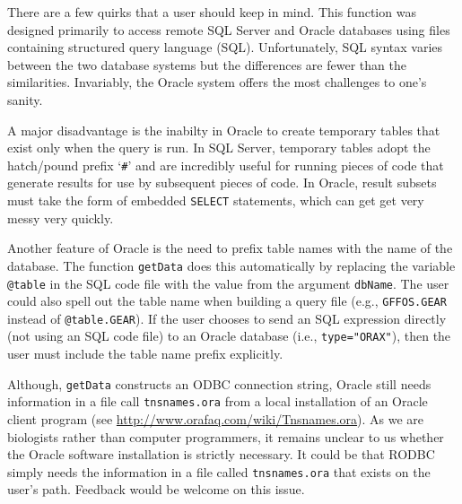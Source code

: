 \documentclass[letterpaper,12pt,fleqn]{article}
\def\tab{\hspace{0.5 in}}
\newcommand{\code}[1]{\small\texttt{#1}\normalsize}
\newcommand{\sQuote}[1]{`#1'}
\begin{document}
\tab There are a few quirks that a user should keep in mind. This function was designed primarily to access remote SQL Server and Oracle databases using files containing structured query language (SQL). Unfortunately, SQL syntax varies between the two database systems but the differences are fewer than the similarities. Invariably, the Oracle system offers the most challenges to one's sanity. 

\tab A major disadvantage is the inabilty in Oracle to create temporary tables that exist only when the query is run. In SQL Server, temporary tables adopt the hatch/pound prefix \sQuote{\code{\#}} and are incredibly useful for running pieces of code that generate results for use by subsequent pieces of code. In Oracle, result subsets must take the form of embedded \code{SELECT} statements, which can get get very messy very quickly. 

\tab Another feature of Oracle is the need to prefix table names with the name of the database. The function \code{getData} does this automatically by replacing the variable \code{@table} in the SQL code file with the value from the argument \code{dbName}. The user could also spell out the table name when building a query file (e.g., \code{GFFOS.GEAR} instead of \code{@table.GEAR}). If the user chooses to send an SQL expression directly (not using an SQL code file) to an Oracle database (i.e., \code{type="ORAX"}), then the user must include the table name prefix explicitly.

\tab Although, \code{getData} constructs an ODBC connection string, Oracle still needs information in a file call \code{tnsnames.ora} from a local installation of an Oracle client program (see \url{http://www.orafaq.com/wiki/Tnsnames.ora}). As we are biologists rather than computer programmers, it remains unclear to us whether the Oracle software installation is strictly necessary. It could be that RODBC simply needs the information in a file called \code{tnsnames.ora} that exists on the user's path. Feedback would be welcome on this issue.
\end{document}
